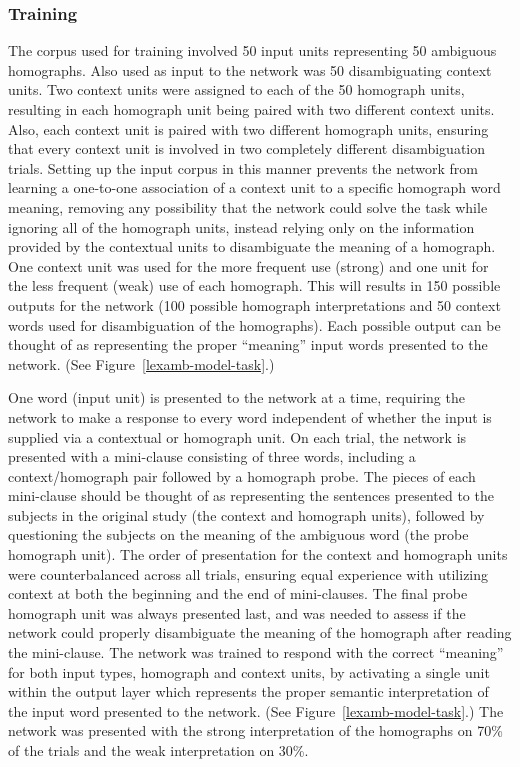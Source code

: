 \subsubsection{Training}
The corpus used for training involved 50 input units representing 50 ambiguous homographs.  Also used as input to the network was 50 disambiguating context units.  Two context units were assigned to each of the 50 homograph units, resulting in each homograph unit being paired with two different context units. Also, each context unit is paired with two different homograph units, ensuring that every context unit is involved in two completely different disambiguation trials.  Setting up the input corpus in this manner prevents the network from learning a one-to-one association of a context unit to a specific homograph word meaning, removing any possibility that the network could solve the task while ignoring all of the homograph units, instead relying only on the information provided by the contextual units to disambiguate the meaning of a homograph.  One context unit was used for the more frequent use (strong) and one unit for the less frequent (weak) use of each homograph.  This will results in 150 possible outputs for the network (100 possible homograph interpretations and 50 context words used for disambiguation of the homographs).  Each possible output can be thought of as representing the proper ``meaning'' input words presented to the network.  (See Figure~\ref{lexamb-model-task}.)  %

One word (input unit) is presented to the network at a time, requiring the network to make a response to every word independent of whether the input is supplied via a contextual or homograph unit.  On each trial, the network is presented with a mini-clause consisting of three words, including a context/homograph pair followed by a homograph probe. The pieces of each mini-clause should be thought of as representing the sentences presented to the subjects in the original study (the context and homograph units), followed by questioning the subjects on the meaning of the ambiguous word (the probe homograph unit).  The order of presentation for the context and homograph units were counterbalanced across all trials, ensuring equal experience with utilizing context at both the beginning and the end of mini-clauses.  The final probe homograph unit was always presented last, and was needed to assess if the network could properly disambiguate the meaning of the homograph after reading the mini-clause.  The network was trained to respond with the correct ``meaning'' for both input types, homograph and context units, by activating a single unit within the output layer which represents the proper semantic interpretation of the input word presented to the network. (See Figure~\ref{lexamb-model-task}.) The network was presented with the strong interpretation of the homographs on 70\% of the trials and the weak interpretation on 30\%.

